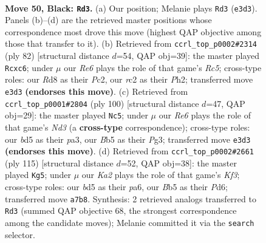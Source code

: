\documentclass[11pt]{article}
\begin{document}
\clearpage

\begin{figure}[p]\centering
\begin{subfigure}{0.46\textwidth}\centering
\resizebox{\linewidth}{!}{%
\newchessgame
\chessboard[
  setfen={3r4/k7/8/1b1B1p1N/1P1R4/4rN2/2R3P1/2K5 b - - 16 50},
  showmover=false,
  pgfstyle=straightmove, color=movearrow, markmove={e3-d3}
]}
\caption{}
\end{subfigure}\hfill
\begin{subfigure}{0.46\textwidth}\centering
\resizebox{\linewidth}{!}{%
\newchessgame
\chessboard[
  setfen={2r5/4rpk1/1PnR4/2R4p/6p1/8/2P4P/2K5 w - - 0 42},
  showmover=false,
  pgfstyle=straightmove, color=movearrow, markmove={c5-c6}
]}
\caption{}
\end{subfigure}
\\[4pt]
\begin{subfigure}{0.46\textwidth}\centering
\resizebox{\linewidth}{!}{%
\newchessgame
\chessboard[
  setfen={1R6/5pk1/r2n4/r7/3P4/p1KN2P1/R7/8 w - - 9 51},
  showmover=false,
  pgfstyle=straightmove, color=movearrow, markmove={d3-c5}
]}
\caption{}
\end{subfigure}\hfill
\begin{subfigure}{0.46\textwidth}\centering
\resizebox{\linewidth}{!}{%
\newchessgame
\chessboard[
  setfen={8/r7/P2p1k2/2pPn3/4B1r1/8/R4K2/4R3 b - - 3 58},
  showmover=false,
  pgfstyle=straightmove, color=movearrow, markmove={f6-g5}
]}
\caption{}
\end{subfigure}
\caption{\textbf{Move 50, Black: \texttt{Rd3}.} (a) Our position; Melanie plays \texttt{Rd3} (\texttt{e3d3}). Panels (b)--(d) are the retrieved master positions whose correspondence most drove this move (highest QAP objective among those that transfer to it). (b) Retrieved from \texttt{ccrl\_top\_p0002\#2314} (ply 82) [structural distance $d$=54, QAP obj=39]: the master played \texttt{Rcxc6}; under $\mu$ our \emph{Re6} plays the role of that game's \emph{Rc5}; cross-type roles: our \emph{R}d8 as their \emph{P}c2, our \emph{r}c2 as their \emph{P}h2; transferred move \texttt{e3d3} \textbf{(endorses this move)}. (c) Retrieved from \texttt{ccrl\_top\_p0001\#2804} (ply 100) [structural distance $d$=47, QAP obj=29]: the master played \texttt{Nc5}; under $\mu$ our \emph{Re6} plays the role of that game's \emph{Nd3} (a \textbf{cross-type} correspondence); cross-type roles: our \emph{b}d5 as their \emph{p}a3, our \emph{B}b5 as their \emph{P}g3; transferred move \texttt{e3d3} \textbf{(endorses this move)}. (d) Retrieved from \texttt{ccrl\_top\_p0002\#2661} (ply 115) [structural distance $d$=52, QAP obj=38]: the master played \texttt{Kg5}; under $\mu$ our \emph{Ka2} plays the role of that game's \emph{Kf3}; cross-type roles: our \emph{b}d5 as their \emph{p}a6, our \emph{B}b5 as their \emph{P}d6; transferred move \texttt{a7b8}. Synthesis: 2 retrieved analogs transferred to \texttt{Rd3} (summed QAP objective 68, the strongest correspondence among the candidate moves); Melanie committed it via the \texttt{search} selector.}
\label{fig:thought-m99}
\end{figure}
\end{document}
